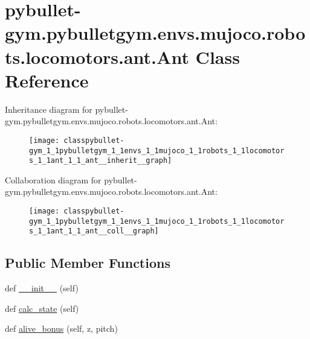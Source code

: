 \hypertarget{classpybullet-gym_1_1pybulletgym_1_1envs_1_1mujoco_1_1robots_1_1locomotors_1_1ant_1_1_ant}{}\section{pybullet-\/gym.pybulletgym.\+envs.\+mujoco.\+robots.\+locomotors.\+ant.\+Ant Class Reference}
\label{classpybullet-gym_1_1pybulletgym_1_1envs_1_1mujoco_1_1robots_1_1locomotors_1_1ant_1_1_ant}


Inheritance diagram for pybullet-\/gym.pybulletgym.\+envs.\+mujoco.\+robots.\+locomotors.\+ant.\+Ant\+:
\nopagebreak
\begin{figure}[H]
\begin{center}
\leavevmode
\texttt{[image: classpybullet-gym\_1\_1pybulletgym\_1\_1envs\_1\_1mujoco\_1\_1robots\_1\_1locomotors\_1\_1ant\_1\_1\_ant\_\_inherit\_\_graph]}
\end{center}
\end{figure}


Collaboration diagram for pybullet-\/gym.pybulletgym.\+envs.\+mujoco.\+robots.\+locomotors.\+ant.\+Ant\+:
\nopagebreak
\begin{figure}[H]
\begin{center}
\leavevmode
\texttt{[image: classpybullet-gym\_1\_1pybulletgym\_1\_1envs\_1\_1mujoco\_1\_1robots\_1\_1locomotors\_1\_1ant\_1\_1\_ant\_\_coll\_\_graph]}
\end{center}
\end{figure}
\subsection*{Public Member Functions}
\begin{DoxyCompactItemize}
\item 
def \hyperlink{classpybullet-gym_1_1pybulletgym_1_1envs_1_1mujoco_1_1robots_1_1locomotors_1_1ant_1_1_ant_a37a61357ef9b48996612b49df39e7f0c}{\+\_\+\+\_\+init\+\_\+\+\_\+} (self)
\item 
def \hyperlink{classpybullet-gym_1_1pybulletgym_1_1envs_1_1mujoco_1_1robots_1_1locomotors_1_1ant_1_1_ant_a3643147d2769736a01dd41159ceac810}{calc\+\_\+state} (self)
\item 
def \hyperlink{classpybullet-gym_1_1pybulletgym_1_1envs_1_1mujoco_1_1robots_1_1locomotors_1_1ant_1_1_ant_a3b53d35e08655d13b396b170a80a3526}{alive\+\_\+bonus} (self, z, pitch)
\end{DoxyCompactItemize}
